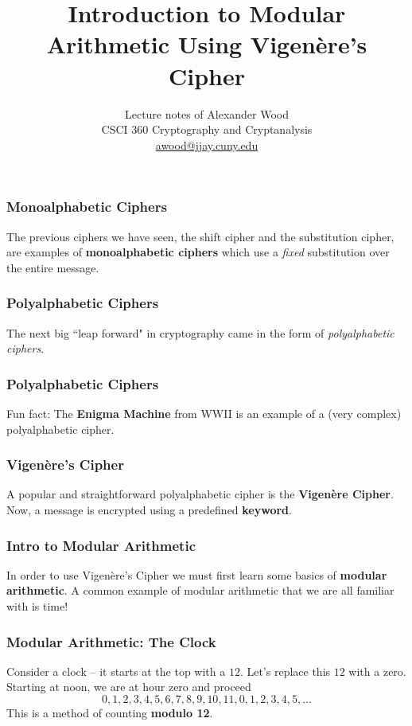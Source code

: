 \documentclass{beamer}
\title[CSCI360]{Introduction to Modular Arithmetic Using Vigen\`{e}re's Cipher}
\author
{Lecture notes of Alexander Wood \\ CSCI 360 Cryptography and Cryptanalysis \\ \scriptsize \href{mailto:awood@jjay.cuny.edu}{awood@jjay.cuny.edu}}
\institute[JJay]{John Jay College of Criminal Justice}
\date{}
\newcommand{\<}{\langle}
\renewcommand{\>}{\rangle}
\begin{document}

\begin{frame}
  \titlepage
\end{frame}


\begin{frame}
\frametitle{Monoalphabetic Ciphers}

The previous ciphers we have seen, the shift cipher and the substitution cipher, are examples of \textbf{monoalphabetic ciphers} which use a \emph{fixed} substitution over the entire message.
\end{frame}

\begin{frame}
\frametitle{Polyalphabetic Ciphers}

The next big ``leap forward" in cryptography came in the form of \emph{polyalphabetic ciphers}. 
\end{frame}

\begin{frame}
\frametitle{Polyalphabetic Ciphers}

Fun fact: The \textbf{Enigma Machine} from WWII is an example of a (very complex) polyalphabetic cipher.
\end{frame}

\begin{frame}
\frametitle{Vigen\`{e}re's Cipher}

A popular and straightforward polyalphabetic cipher is the \textbf{Vigen\`{e}re Cipher}. Now, a message is encrypted using a predefined \textbf{keyword}.
\end{frame}

\begin{frame}
\frametitle{Intro to Modular Arithmetic}

In order to use Vigen\`{e}re's Cipher we must first learn some basics of \textbf{modular arithmetic}. A common example of modular arithmetic that we are all familiar with is time!
\end{frame}

\begin{frame}
\frametitle{Modular Arithmetic: The Clock}

Consider a clock -- it starts at the top with a $12$. Let's replace this $12$ with a zero. Starting at noon, we are at hour zero and proceed
\[
0, 1, 2, 3, 4, 5, 6, 7, 8, 9, 10, 11, 0, 1, 2, 3, 4, 5, \dots
\]
This is a method of counting \textbf{modulo 12}.
\end{frame}
\end{document}
